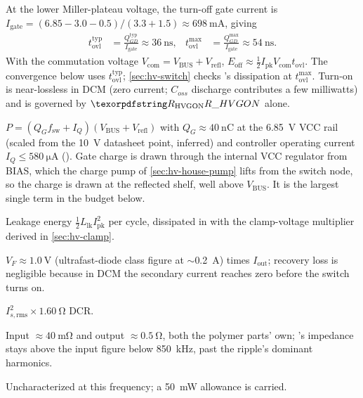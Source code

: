 \begin{description}[style=nextline]
    At the lower Miller-plateau voltage, the turn-off gate current is
    $I_{\mathrm{gate}} = (6.85-3.0-0.5)/(3.3+1.5) \approx \SI{698}{\milli\ampere}$,
    giving
    \begin{align*}
      t_{\mathrm{ovl}}^{\mathrm{typ}} &= \frac{Q_{GD}^{\mathrm{typ}}}{I_{\mathrm{gate}}}
        \approx \SI{36}{\nano\second}, &
      t_{\mathrm{ovl}}^{\max} &= \frac{Q_{GD}^{\max}}{I_{\mathrm{gate}}}
        \approx \SI{54}{\nano\second}.
    \end{align*}
    With the commutation voltage $V_{\mathrm{com}} = V_{\mathrm{BUS}} +
    V_{\mathrm{refl}}$, $E_{\mathrm{off}} \approx \tfrac{1}{2} I_{\mathrm{pk}}
    V_{\mathrm{com}} t_{\mathrm{ovl}}$. The convergence below uses
    $t_{\mathrm{ovl}}^{\mathrm{typ}}$; \cref{sec:hv-switch} checks
    's dissipation at $t_{\mathrm{ovl}}^{\max}$. Turn-on is
    near-lossless in DCM (zero current; $C_{oss}$ discharge contributes a few
    milliwatts) and is governed by $\des{R}{HVGON}$ alone.
    \item[Gate drive and controller]
    $P = (Q_G f_{\mathrm{sw}} + I_Q)(V_{\mathrm{BUS}} + V_{\mathrm{refl}})$
    with $Q_G \approx \SI{40}{\nano\coulomb}$ at the \SI{6.85}{\volt} VCC rail
    (scaled from the \SI{10}{\volt} datasheet point, inferred) and controller
    operating current $I_Q \le \SI{580}{\micro\ampere}$ (). Gate
    charge is drawn through the internal VCC regulator from BIAS, which the
    charge pump of \cref{sec:hv-house-pump} lifts from the switch node, so the
    charge is drawn at the reflected shelf, well above $V_{\mathrm{BUS}}$. It is
    the largest single term in the budget below.

  \item[RCD clamp] Leakage energy $\tfrac{1}{2} L_{\mathrm{lk}} I_{\mathrm{pk}}^2$
    per cycle, dissipated in  with the clamp-voltage multiplier
    derived in \cref{sec:hv-clamp}.
  \item[Rectifier] $V_F \approx \SI{1.0}{\volt}$ (ultrafast-diode class figure at
    $\sim$\SI{0.2}{\ampere}) times $I_{\mathrm{out}}$; recovery loss is negligible
    because in DCM the secondary current reaches zero before the switch turns on.
  \item[Secondary conduction] $I_{s,\mathrm{rms}}^2 \times \SI{1.60}{\ohm}$ DCR.
  \item[Capacitor ESR] Input $\approx\SI{40}{\milli\ohm}$ and output
  $\approx\SI{0.5}{\ohm}$, both the polymer parts' own; 's
  impedance stays above the input figure below \SI{850}{\kilo\hertz}, past the
  ripple's dominant harmonics.
  \item[Core] Uncharacterized at this frequency; a \SI{50}{\milli\watt} allowance
    is carried.
\end{description}

